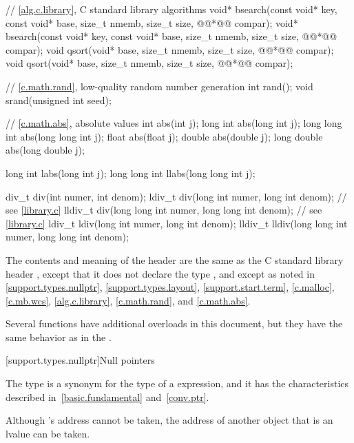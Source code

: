 \begin{codeblock}
{  // \ref{alg.c.library}, C standard library algorithms
  void* bsearch(const void* key, const void* base, size_t nmemb, size_t size,
                @@*@\itcorr[-1]@ compar);
  void* bsearch(const void* key, const void* base, size_t nmemb, size_t size,
                @@*@\itcorr[-1]@ compar);
  void qsort(void* base, size_t nmemb, size_t size, @@*@\itcorr[-1]@ compar);
  void qsort(void* base, size_t nmemb, size_t size, @@*@\itcorr[-1]@ compar);

  // \ref{c.math.rand}, low-quality random number generation
  int rand();
  void srand(unsigned int seed);

  // \ref{c.math.abs}, absolute values
  int abs(int j);
  long int abs(long int j);
  long long int abs(long long int j);
  float abs(float j);
  double abs(double j);
  long double abs(long double j);

  long int labs(long int j);
  long long int llabs(long long int j);

  div_t div(int numer, int denom);
  ldiv_t div(long int numer, long int denom);                   // see \ref{library.c}
  lldiv_t div(long long int numer, long long int denom);        // see \ref{library.c}
  ldiv_t ldiv(long int numer, long int denom);
  lldiv_t lldiv(long long int numer, long long int denom);
}
\end{codeblock}

\pnum
The contents and meaning of the header  are the same as
the C standard library header ,
except that it does not declare the type ,
and except as noted in
\ref{support.types.nullptr},
\ref{support.types.layout},
\ref{support.start.term},
\ref{c.malloc},
\ref{c.mb.wcs},
\ref{alg.c.library},
\ref{c.math.rand}, and
\ref{c.math.abs}.
\begin{note}
Several functions have additional overloads in this document,
but they have the same behavior as in the .
\end{note}


[support.types.nullptr]{Null pointers}

\pnum
{}%
The type  is a synonym
for the type of a  expression, and it
has the characteristics
described in~\ref{basic.fundamental} and~\ref{conv.ptr}.
\begin{note}
Although 's address cannot be taken, the address of another
 object that is an lvalue can be taken.
\end{note}

